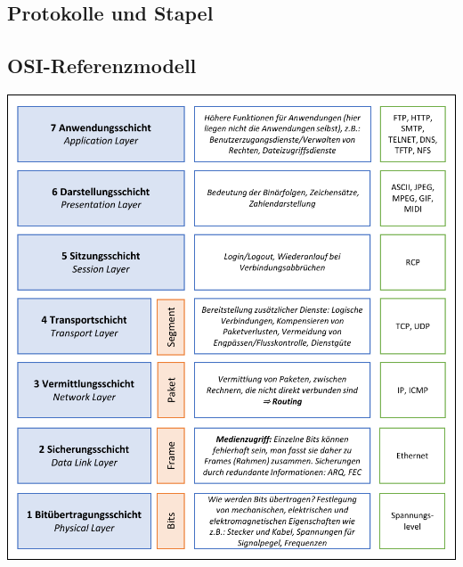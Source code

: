 \documentclass
[
	8pt,		%
	ngerman,	%
	a4paper,	%
	landscape,	%
	final		%
]{extarticle}
\begin{document}
\begin{multicols*}{4}
	\fontsize{6}{6}\selectfont
	\section{Protokolle und Stapel}
	\subsection{OSI-Referenzmodell}
	\begin{center}
		\includegraphics[width=\linewidth]{Documents/OSI.pdf}
	\end{center}

\end{multicols*}
\end{document}
